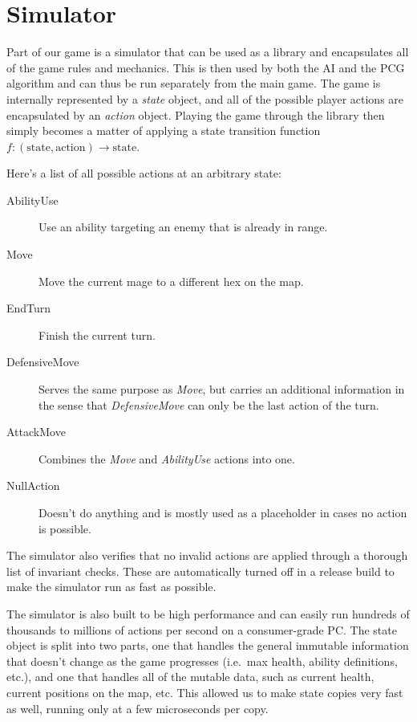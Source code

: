 \section{Simulator}

Part of our game is a simulator that can be used as a library and encapsulates
all of the game rules and mechanics. This is then used by both the AI and the
PCG algorithm and can thus be run separately from the main game. The game is
internally represented by a \emph{state} object, and all of the possible player
actions are encapsulated by an \emph{action} object.  Playing the game through
the library then simply becomes a matter of applying a state transition
function $f: (\text{state}, \text{action}) \rightarrow \text{state}$.

Here's a list of all possible actions at an arbitrary state:

\begin{description}
\item [AbilityUse] Use an ability targeting an enemy that is already in range.
\item [Move] Move the current mage to a different hex on the map.
\item [EndTurn] Finish the current turn.
\item [DefensiveMove] Serves the same purpose as \emph{Move}, but carries an
additional information in the sense that \emph{DefensiveMove} can only be
the last action of the turn.
\item [AttackMove] Combines the \emph{Move} and \emph{AbilityUse} actions into one.
\item [NullAction] Doesn't do anything and is mostly used as a placeholder in cases no action is possible.
\end{description}

The simulator also verifies that no invalid actions are applied through a
thorough list of invariant checks. These are automatically turned off in a
release build to make the simulator run as fast as possible.

The simulator is also built to be high performance and can easily run hundreds
of thousands to millions of actions per second on a consumer-grade PC\@.
The state object is split into two parts, one that handles the
general immutable information that doesn't change as the game progresses (i.e.\
max health, ability definitions, etc.), and one that handles all of the
mutable data, such as current health, current positions on the map, etc.
This allowed us to make state copies very fast as well, running only at a few
microseconds per copy.

